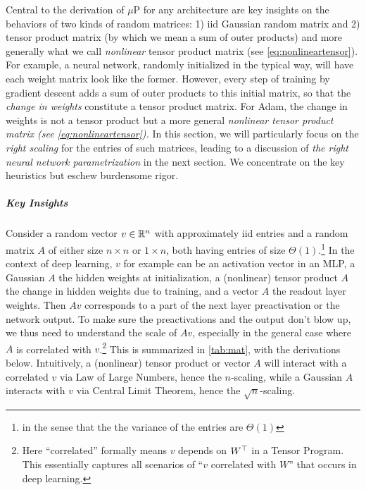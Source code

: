 \documentclass{article}
\theoremstyle{definition}
\begin{document}
    Central to the derivation of $\mu$P for any architecture are key insights on the behaviors of two kinds of random matrices: 1) iid Gaussian random matrix and 2) tensor product matrix (by which we mean a sum of outer products) and more generally what we call \emph{nonlinear} tensor product matrix (see \cref{eq:nonlineartensor}). For example, a neural network, randomly initialized in the typical way, will have each weight matrix look like the former. However, every step of training by gradient descent adds a sum of outer products to this initial matrix, so that the \emph{change in weights} constitute a tensor product matrix. For Adam, the change in weights is not a tensor product but a more general \emph{nonlinear tensor product matrix (see \cref{eq:nonlineartensor}).} In this section, we will particularly focus on the \emph{right scaling} for the entries of such matrices, leading to a discussion of \emph{the right neural network parametrization} in the next section. 
    We concentrate on the key heuristics but eschew burdensome rigor.
    
    \subparagraph*{Key Insights}
    
    Consider a random vector $v\in\mathbb{R}^{n}$ with approximately iid entries and a random matrix $A$ of either size $n\times n$ or $1\times n$, both having entries of size $\Theta(1)$.\footnote{in the sense that the the variance of the entries are $\Theta(1)$} In the context of deep learning, $v$ for example can be an activation vector in an MLP, a Gaussian $A$ the hidden weights at initialization, a (nonlinear) tensor product $A$ the change in hidden weights due to training, and a vector $A$ the readout layer weights. Then $Av$ corresponds to a part of the next layer preactivation or the network output. To make sure the preactivations and the output don't blow up, we thus need to understand the scale of $Av$, especially in the general case where $A$ is correlated with $v$.\footnote{Here ``correlated'' formally means $v$ depends on $W^{\top}$ in a Tensor Program. This essentially captures all scenarios of ``$v$ correlated with $W$'' that occurs in deep learning.} This is summarized in \cref{tab:mat}, with the derivations below. Intuitively, a (nonlinear) tensor product or vector $A$ will interact with a correlated $v$ via Law of Large Numbers, hence the $n$-scaling, while a Gaussian $A$ interacts with $v$ via Central Limit Theorem, hence the $\sqrt{n}$-scaling.
    
\end{document}
